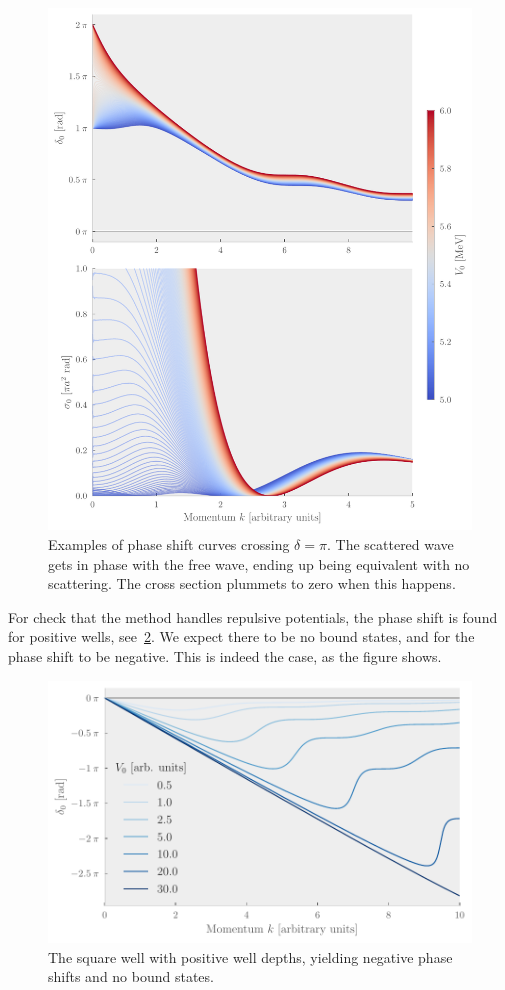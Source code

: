 \begin{figure}[hp]
  \centering
  \includegraphics[]{Figures/square_well_wave_pi.pdf}
  \caption{\label{fig:pizero}Examples of phase shift curves crossing \(\delta =
    \pi\). The scattered wave gets in phase with the free wave, ending up being equivalent
    with no scattering. The cross section plummets to zero when this happens.}
\end{figure}

For check that the method handles repulsive potentials, the phase shift is found for positive wells, see~\cref{fig:positivesquare}. We expect there to be no bound states, and for
the phase shift to be negative. This is indeed the case, as the figure shows.

\begin{figure}[ht!]
  \centering
  \includegraphics[]{Figures/positive_square_well.pdf}
  \caption{\label{fig:positivesquare}The square well with positive well depths,
    yielding negative phase shifts and no bound states.}
\end{figure}


